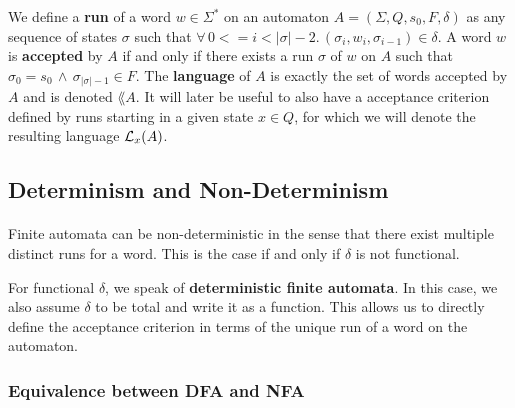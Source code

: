 \documentclass[11pt,a4paper,oneside]{book}
\begin{document}
                We define a \textbf{run} of a word $w \in \Sigma^*$ on an automaton $A = (\Sigma, Q, s_0, F, \delta)$ as any sequence of states $\sigma$ such that 
                $\forall \, 0 <= i < \vert\sigma\vert-2. \, (\sigma_i, w_i, \sigma_{i-1}) \in \delta$.
            A word $w$ is \textbf{accepted} by $A$ if and only if there exists a run $\sigma$ of $w$ on $A$ such that $\sigma_0 = s_0 \, \wedge \, \sigma_{\vert\sigma\vert-1} \in F$.
            The \textbf{language} of $A$ is exactly the set of words accepted by $A$ and is denoted $\lang{A}$. 
            It will later be useful to also have a acceptance criterion defined by runs starting in a given state $x \in Q$, for which we will denote the resulting language $\mathcal{L}_x(A)$.

            \subsection{Determinism and Non-Determinism}
                \paragraph{} 
                Finite automata can be non-deterministic in the sense that there exist multiple distinct runs for a word. This is the case if and only if $\delta$ is not functional. 



                For functional $\delta$, we speak of \textbf{deterministic finite automata}. In this case, we also assume $\delta$ to be total and write it as a function. 
                This allows us to directly define the acceptance criterion in terms of the unique run of a word on the automaton. 


                \subsubsection{Equivalence between DFA and NFA}
\end{document}
